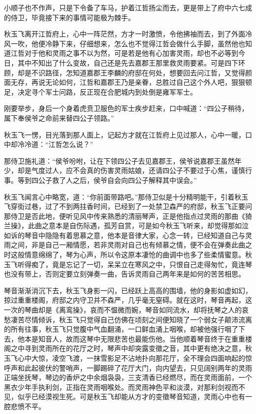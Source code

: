 小顺子也不作声，只是下令备了车马，护着江哲扬尘而去，更是带上了府中六七成的侍卫，毕竟接下来的事情可能极为棘手。

秋玉飞离开江哲府上，心中一阵茫然，方才一时激愤，令他拂袖而去，到了外面冷风一吹，他便冷静下来，仔细想来，怎么也不觉得江哲会做什么手脚，虽然他也知道江哲对于他和灵雨之事不以为然，可是若是他有心加害灵雨，却也不必等到今日，其中不知出了什么变故，自己还是先去嘉郡王那里救灵雨要紧。可是四下环顾，却是不识路径，怎知道嘉郡王李麟的府邸在何处，想要回去问江哲，又觉得颜面无存，再说无论如何，江哲和嘉郡王乃是亲眷，总胜过自己这个外人吧，狠狠顿足，决定寻个军士问路，反正现在合肥城内到处倒是雍军军士。

刚要举步，身后一个身着虎贲卫服色的军士疾步赶来，口中喊道：“四公子稍待，属下奉侯爷之命前来替四公子领路。”

秋玉飞一愣，目光落到那人面上，记起方才就在江哲府上见过那人，心中一暖，口中却冷冷道：“江哲怎么说？”

那侍卫施礼道：“侯爷吩咐，让在下领四公子去见嘉郡王，侯爷说嘉郡王虽然年少，却是气度过人，应不会真的伤害灵雨姑娘，还请四公子不要过于心焦，谨慎行事。等到四公子救了人之后，侯爷自会向四公子解释其中误会。”

秋玉飞闻言心中略宽，道：“你前面带路吧。”那侍卫似是十分精明能干，引着秋玉飞穿街过巷，过了不到两拄香时间，已经到了一处禁卫森严的府邸，秋玉飞正要问那侍卫是否此地，便听见风中传来熟悉的清丽琴声，正是他指点过灵雨的那曲《猗兰操》，此曲之意本是自伤际遇，孤芳自赏，可是如今秋玉飞听来，却觉得那如泣如诉的琴音中隐隐有着思慕之意，他本是音律大家，心念一转，已经知道自己与灵雨之间，非是自己一厢情愿，若非灵雨对自己也有倾慕之情，便不会在弹奏此曲之时这般情意绵绵了，琴为心声，所以令这原本凄怆的曲调中也多了些柔情蜜意。秋玉飞听得痴了，竟是忘记了一切，呆呆立在寒风之中，只恨自己走得匆忙，竟连琴也没有带上，否则定要立刻弹奏一曲，告诉灵雨自己两年来是如何的苦苦相思。

琴音渐渐消沉下去，秋玉飞身影一闪，已经跃上高高的围墙，他的身影如虚如幻，掠过重重楼阁，府邸之内守卫并不森严，几乎毫无窒碍。就在这时，琴音再起，这一次的琴曲却是《离鸾操》，哀而不愠微而婉，琴音如同流水，却将抚琴之人的哀愁凄苦尽情倾诉，秋玉飞只觉得自己仿佛在顷刻之间便知晓了一个弱女子颠沛流离的所有往事，秋玉飞只觉腹中气血翻涌，一口鲜血涌上咽喉，却被他强行咽了下去，他本是知音人，故而这琴中无限悲苦也最能伤他。当他顺着琴音终于在重重楼阁之中寻到灵雨所在的花厅之时，琴声中却突露变徵之音，其中更有绝决之意，秋玉飞心中大惊，凌空飞渡，一抹雪影足不沾地扑向那花厅，全不理会四面响起的惊呼声和此起彼伏的警哨声，一脚踢碎了花厅大门，向内望去，只见阔别两年的灵雨正端坐抚琴，琴边的香炉之中余烟袅袅，三支清香已经燃尽，而在灵雨面前，一个黑衣少年手执利剑，正指在灵雨咽喉处。而灵雨神色平和淡漠，对那利剑视而不见，似乎已经漠视生死。可是秋玉飞却能从方才的变徵琴音知道，灵雨心中也有一腔悲愤不平。

